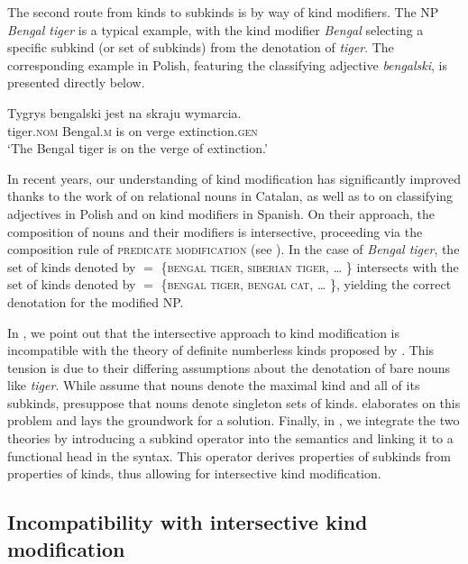 \documentclass[output=paper,
colorlinks,
citecolor=brown,
newtxmath
]{langscibook}
\begin{document}
\noindent
The second route from kinds to subkinds is by way of kind modifiers. The NP \textit{Bengal tiger} is a typical example, with the kind modifier \textit{Bengal} selecting a specific subkind (or set of subkinds) from the denotation of \textit{tiger}. The corresponding example in Polish, featuring the classifying adjective \textit{bengalski}, is presented directly below.

\ea \label{ex:subkind_2} \gll
Tygrys bengalski jest na skraju wymarcia.\\
tiger.\textsc{nom} Bengal.\textsc{m} is on verge extinction.\textsc{gen}\\
\glt `The Bengal tiger is on the verge of extinction.'
\z

\noindent
In recent years, our understanding of kind modification has significantly improved thanks to the work of \citet{McNally.Boleda2004} on relational nouns in Catalan, as well as to \citet{Wagiel2014} on classifying adjectives in Polish and \citet{Borik.Espinal2015} on kind modifiers in Spanish. On their approach, the composition of nouns and their modifiers is intersective, proceeding via the composition rule of \textsc{predicate modification} (see \citealt{Heim.Kratzer1998}). In the case of \textit{Bengal tiger}, the set of kinds denoted by  $=$ \{\textsc{bengal tiger}, \textsc{siberian tiger}, {\dots} \} intersects with the set of kinds denoted by   $=$ \{\textsc{bengal tiger}, \textsc{bengal cat}, {\dots} \}, yielding the correct denotation for the modified NP.

In , we point out that the intersective approach to kind modification is incompatible with the theory of definite numberless kinds proposed by \citet{Borik.Espinal2012, Borik.Espinal2015}. This tension is due to their differing assumptions about the denotation of bare nouns like \textit{tiger}. While \citet{McNally.Boleda2004} assume that nouns denote the maximal kind and all of its subkinds, \citet{Borik.Espinal2012} presuppose that nouns denote singleton sets of kinds.  elaborates on this problem and lays the groundwork for a solution. Finally, in , we integrate the two theories by introducing a subkind operator into the semantics and linking it to a functional head in the syntax. This operator derives properties of subkinds from properties of kinds, thus allowing for intersective kind modification.


\subsection{Incompatibility with intersective kind modification}
\label{sec:problem-intersec}
\end{document}
